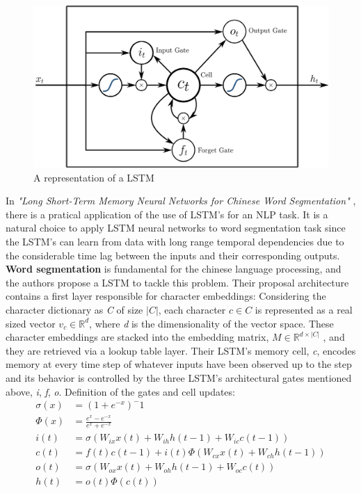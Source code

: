 \documentclass{scrartcl}
\begin{document}
    \begin{figure}[h!]
        \centering
        \includegraphics[scale=0.2]{lstmnn.png}
        \caption{A representation of a LSTM}
    \end{figure}
    In \textit{"Long Short-Term Memory Neural Networks for Chinese Word Segmentation"} 
    \cite{chen-etal-2015-long}, there is a pratical application of the use of 
    LSTM's for an NLP task. It is a natural choice to apply LSTM neural networks 
    to word segmentation task since the LSTM's can learn from data with long range temporal 
    dependencies due to the considerable time lag between the inputs and their 
    corresponding outputs.
    \textbf{Word segmentation} is fundamental for the chinese language processing, and the authors
    propose a LSTM to tackle this problem.
    Their proposal architecture contains a first layer responsible for character embeddings:
    Considering the character dictionary as \textit{C} of size $|C|$, each character
    $c \in C$ is represented as a real sized vector $v_c \in \mathbb{R}^d$, where \textit{d}
    is the dimensionality of the vector space. These character embeddings are stacked into 
    the embedding matrix, $M \in \mathbb{R}^{d \times |C|}$ , and they are retrieved via a 
    lookup table layer. 
    \newpage
    Their LSTM's memory cell, \textit{c}, encodes memory at every time step of whatever inputs
    have been observed up to the step and its behavior is controlled by the three LSTM's 
    architectural gates mentioned above, \textit{i}, \textit{f}, \textit{o}.
    Definition of the gates and cell updates:
    \begin{align*}
        \sigma(x) &= (1 + e^{-x})^-1 \\
        \Phi(x) &= \frac{e^x - e^{-x}}{e^x + e^{-x}} \\
        i(t) &= \sigma(W_{ix}x(t) + W_{ih}h(t-1) + W_{ic}c(t-1)) \\
        c(t) &= f(t)c(t-1) + i(t)\Phi(W_{cx}x(t) + W_{ch}h(t-1)) \\
        o(t) &= \sigma(W_{ox}x(t) + W_{oh}h(t-1) + W_{oc}c(t)) \\
        h(t) &= o(t)\Phi(c(t))
    \end{align*}
\end{document}
